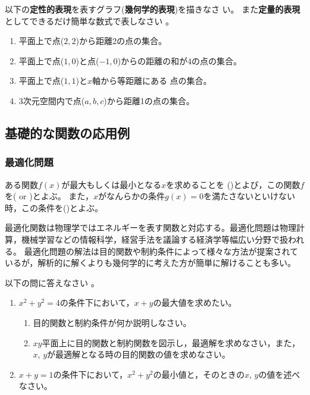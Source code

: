 \documentclass[twocolumn,11pt]{jarticle}
\begin{document}
\nquestion
以下の\textbf{定性的表現}を表すグラフ(\textbf{幾何学的表現})を描きなさ
い。
また\textbf{定量的表現}としてできるだけ簡単な数式で表しなさい
。
\begin{enumerate}
\item\label{jitem:circle} 平面上で点($2,2$)から距離2の点の集合。
\item\label{jitem:ellipse} 
  平面上で点($1,0$)と点($-1,0$)からの距離の和が4の点の集合。
\item\label{jitem:parabola} 平面上で点($1,1$)と$x$軸から等距離にある
  点の集合。
\item\label{jitem:sphere} 3次元空間内で点($a,b,c$)から距離1の点の集合。
\end{enumerate}


\subsection{基礎的な関数の応用例}
\subsubsection{最適化問題}
ある関数$f(x)$が最大もしくは最小となる$x$を求めることを
()とよび，この関数$f$を( or )とよぶ。
また，$x$がなんらかの条件$g(x)=0$を満たさないといけない時，この条件を()とよぶ。

最適化関数は物理学ではエネルギーを表す関数と対応する。最適化問題は物理計算，機械学習などの情報科学，経営手法を議論する経済学等幅広い分野で扱われる。
最適化問題の解法は目的関数や制約条件によって様々な方法が提案されているが，解析的に解くよりも幾何学的に考えた方が簡単に解けることも多い。

\nquestion
以下の問に答えなさい
。
\begin{enumerate}
\item\label{item:range(x+y)} $x^2+y^2=4$の条件下において，$x+y$の最大値を求めたい。
	\begin{enumerate}
	\item 目的関数と制約条件が何か説明しなさい。
	\item $xy$平面上に目的関数と制約関数を図示し，最適解を求めなさい，また，$x$, $y$が最適解となる時の目的関数の値を求めなさい。
	\end{enumerate}
\item\label{item:min(x^2+y^2)} $x+y=1$の条件下において，$x^2+y^2$の最小値と，そのときの$x$, $y$の値を述べなさい。
\end{enumerate}
\end{document}
